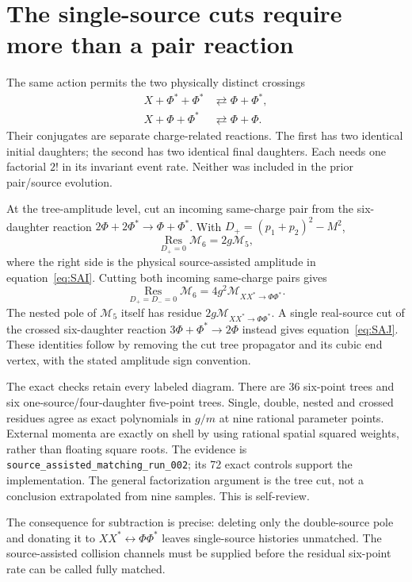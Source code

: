 \documentclass[11pt]{article}
\begin{document}
\section{The single-source cuts require more than a pair reaction}
The same action permits the two physically distinct crossings
\begin{align}
 X+\Phi^*+\Phi^*&\rightleftarrows\Phi+\Phi^*,\label{eq:SAI}\\
 X+\Phi+\Phi^*&\rightleftarrows\Phi+\Phi.\label{eq:SAJ}
\end{align}
Their conjugates are separate charge-related reactions. The first has
two identical initial daughters; the second has two identical final
daughters. Each needs one factorial $2!$ in its invariant event rate.
Neither was included in the prior pair/source evolution.

At the tree-amplitude level, cut an incoming same-charge pair from the
six-daughter reaction $2\Phi+2\Phi^*\to\Phi+\Phi^*$. With
$D_+=(p_1+p_2)^2-M^2$,
\begin{equation}
 \operatorname*{Res}_{D_+=0}\mathcal M_6=2g\mathcal M_5,
\end{equation}
where the right side is the physical source-assisted amplitude in
equation~\eqref{eq:SAI}. Cutting both incoming same-charge pairs gives
\begin{equation}
 \operatorname*{Res}_{D_+=D_-=0}\mathcal M_6
 =4g^2\mathcal M_{XX^*\to\Phi\Phi^*}.
\end{equation}
The nested pole of $\mathcal M_5$ itself has residue
$2g\mathcal M_{XX^*\to\Phi\Phi^*}$. A single real-source cut of the crossed
six-daughter reaction $3\Phi+\Phi^*\to2\Phi$ instead gives
equation~\eqref{eq:SAJ}. These identities follow by removing the cut tree
propagator and its cubic end vertex, with the stated amplitude sign convention.

The exact checks retain every labeled diagram. There are 36 six-point
trees and six one-source/four-daughter five-point trees. Single, double,
nested and crossed residues agree as exact polynomials in $g/m$ at nine
rational parameter points. External momenta are exactly on shell by using
rational spatial squared weights, rather than floating square roots.
The evidence is \texttt{source\_assisted\_matching\_run\_002}; its 72
exact controls support the implementation. The general factorization
argument is the tree cut, not a conclusion extrapolated from nine samples.
This is self-review.

The consequence for subtraction is precise: deleting only the double-source
pole and donating it to $XX^*\leftrightarrow\Phi\Phi^*$ leaves single-source
histories unmatched. The source-assisted collision channels must be supplied
before the residual six-point rate can be called fully matched.
\end{document}
